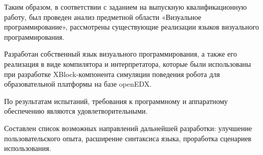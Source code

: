 \conclusion
Таким образом, в соответствии с заданием на выпускную квалификационную работу, был проведен анализ предметной области «Визуальное программирование», рассмотрены существующие реализации языков визуального программирования.

Разработан собственный язык визуального программирования, а также его реализация в виде компилятора и интерпретатора, которые были использованы при разработке XBlock-компонента симуляции поведения робота для образовательной платформы на базе openEDX.

По результатам испытаний, требования к программному и аппаратному обеспечению являются удовлетворительными.

Составлен список возможных направлений дальнейшей разработки: улучшение пользовательского опыта, расширение синтаксиса языка, проработка сценариев использования.
